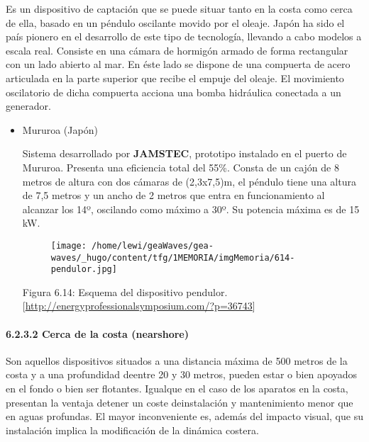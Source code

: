 \documentclass[]{article}
\let\oldparagraph\paragraph
\renewcommand{\paragraph}[1]{\oldparagraph{#1}\mbox{}}
\begin{document}
\begin{itemize}
  Es un dispositivo de captación que se puede situar tanto en la costa
  como cerca de ella, basado en un péndulo oscilante movido por el
  oleaje. Japón ha sido el país pionero en el desarrollo de este tipo de
  tecnología, llevando a cabo modelos a escala real. Consiste en una
  cámara de hormigón armado de forma rectangular con un lado abierto al
  mar. En éste lado se dispone de una compuerta de acero articulada en
  la parte superior que recibe el empuje del oleaje. El movimiento
  oscilatorio de dicha compuerta acciona una bomba hidráulica conectada
  a un generador.

  \begin{itemize}
  \item
    Mururoa (Japón)

    Sistema desarrollado por \textbf{JAMSTEC}, prototipo instalado en el
    puerto de Mururoa. Presenta una eficiencia total del 55\%. Consta de
    un cajón de 8 metros de altura con dos cámaras de (2,3x7,5)m, el
    péndulo tiene una altura de 7,5 metros y un ancho de 2 metros que
    entra en funcionamiento al alcanzar los 14º, oscilando como máximo a
    30º. Su potencia máxima es de 15 kW.

    \begin{figure}
    \centering
    \texttt{[image: /home/lewi/geaWaves/gea-waves/\_hugo/content/tfg/1MEMORIA/imgMemoria/614-pendulor.jpg]}
    \caption{}
    \end{figure}

    Figura 6.14: Esquema del dispositivo pendulor.
    {[}\url{http://energyprofessionalsymposium.com/?p=36743}{]} 
  \end{itemize}
\end{itemize}

\paragraph{6.2.3.2 Cerca de la costa (nearshore)}\label{header-n228}

Son aquellos dispositivos situados a una distancia máxima de 500 metros
de la costa y a una profundidad deentre 20 y 30 metros, pueden estar o
bien apoyados en el fondo o bien ser flotantes. Igualque en el caso de
los aparatos en la costa, presentan la ventaja detener un coste
deinstalación y mantenimiento menor que en aguas profundas. El mayor
inconveniente es, además del impacto visual, que su instalación implica
la modificación de la dinámica costera.
\end{document}
